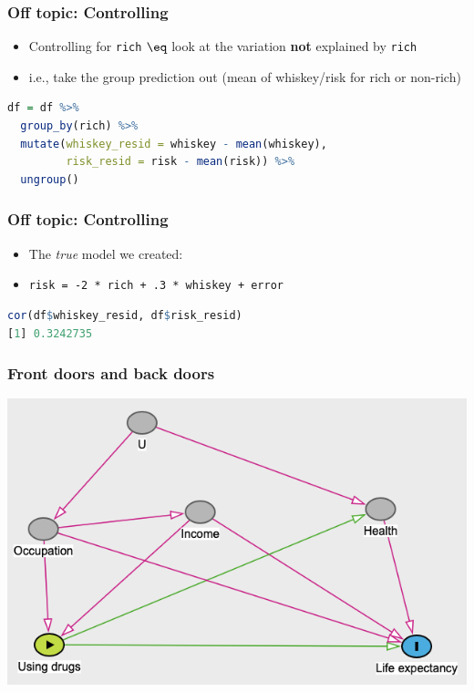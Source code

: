 \documentclass[aspectratio=43]{beamer}
\begin{document}
\begin{frame}[fragile]
\frametitle{Off topic: Controlling}
\centering

\begin{itemize}
  \item Controlling for \texttt{rich} $\eq$ look at the variation \textbf{not} explained by \texttt{rich}
  \item i.e., take the group prediction out (mean of whiskey/risk for rich or non-rich)
\end{itemize}

\begin{lstlisting}[language=R]
df = df %>%
  group_by(rich) %>%
  mutate(whiskey_resid = whiskey - mean(whiskey),
         risk_resid = risk - mean(risk)) %>%
  ungroup()
\end{lstlisting}

\end{frame}

\begin{frame}[fragile]
\frametitle{Off topic: Controlling}
\centering

\begin{itemize}
  \item The \textit{true} model we created:
  \item[] \texttt{risk = -2 * rich + .3 * whiskey + error}
\end{itemize}

\begin{lstlisting}[language=R]
cor(df$whiskey_resid, df$risk_resid)
[1] 0.3242735
\end{lstlisting}

\end{frame}

\begin{frame}
\frametitle{Front doors and back doors}
\centering

\includegraphics[width = \textwidth]{../img/drugs_dag1}

\end{frame}
\end{document}
